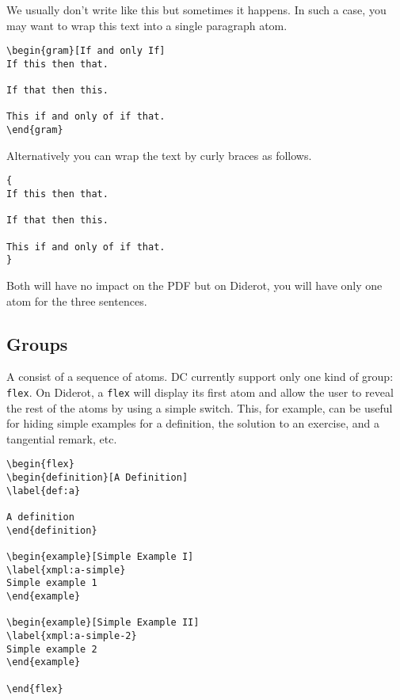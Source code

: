 We usually don't write like this but sometimes it happens.
%
In such a case, you may want to wrap this text into a single paragraph atom.
%
\begin{lstlisting}
\begin{gram}[If and only If]
If this then that.

If that then this.

This if and only of if that.
\end{gram}
\end{lstlisting}
%
Alternatively you can wrap the text by curly braces as follows.
%
\begin{lstlisting}
{
If this then that.

If that then this.

This if and only of if that.
}
\end{lstlisting}
%
%
Both will have no impact on the PDF but on Diderot, you will have only one atom for the three sentences.


\subsection{Groups}
\label{sec:mtl::groups}

\begin{definition}[Group]
A  consist of a sequence of atoms.  DC currently support only one kind of group: \lstinline`flex`.  On Diderot, a \lstinline`flex` will display its first atom and allow the user to reveal the rest of the atoms by using a simple switch.  This, for example, can be useful for hiding simple examples for a definition, the solution to an exercise, and a tangential remark, etc. 

\begin{lstlisting}
\begin{flex}
\begin{definition}[A Definition]
\label{def:a}

A definition
\end{definition}

\begin{example}[Simple Example I]
\label{xmpl:a-simple}
Simple example 1
\end{example}

\begin{example}[Simple Example II]
\label{xmpl:a-simple-2}
Simple example 2
\end{example}

\end{flex}
\end{lstlisting}
\end{definition}

